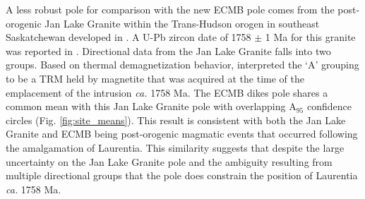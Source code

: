 \documentclass[draft]{agujournal2019}
\begin{document}
 A less robust pole for comparison with the new ECMB pole comes from the post-orogenic Jan Lake Granite within the Trans-Hudson orogen in southeast Saskatchewan developed in . A U-Pb zircon date of 1758 $\pm$ 1 Ma for this granite was reported in . Directional data from the Jan Lake Granite falls into two groups. Based on thermal demagnetization behavior,  interpreted the `A' grouping to be a TRM held by magnetite that was acquired at the time of the emplacement of the intrusion \textit{ca.} 1758 Ma.  The ECMB dikes pole shares a common mean with this Jan Lake Granite pole with overlapping A$_{95}$ confidence circles (Fig. \ref{fig:site_means}). This result is consistent with both the Jan Lake Granite and ECMB being post-orogenic magmatic events that occurred following the amalgamation of Laurentia. This similarity suggests that despite the large uncertainty on the Jan Lake Granite pole and the ambiguity resulting from multiple directional groups that the pole does constrain the position of Laurentia \textit{ca.} 1758 Ma. 
 
\end{document}
